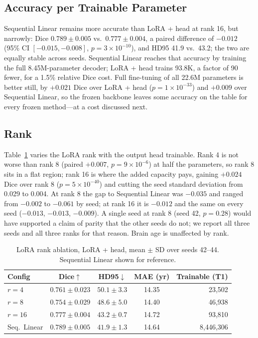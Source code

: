\documentclass[journal,twoside,web]{ieeecolor}
\begin{document}
\subsection{Accuracy per Trainable Parameter}
\label{sec:res_cost}

Sequential Linear remains more accurate than LoRA + head at rank 16, but narrowly: Dice $0.789\pm0.005$ vs.\ $0.777\pm0.004$, a paired difference of $-0.012$ (95\% CI $[-0.015, -0.008]$, $p = 3{\times}10^{-10}$), and HD95 41.9 vs.\ 43.2; the two are equally stable across seeds. Sequential Linear reaches that accuracy by training the full 8.45M-parameter decoder; LoRA + head trains 93.8K, a factor of 90 fewer, for a 1.5\% relative Dice cost. Full fine-tuning of all 22.6M parameters is better still, by $+0.021$ Dice over LoRA + head ($p = 1{\times}10^{-33}$) and $+0.009$ over Sequential Linear, so the frozen backbone leaves some accuracy on the table for every frozen method---at a cost discussed next.

\subsection{Rank}
\label{sec:res_rank}

Table~\ref{tab:rank} varies the LoRA rank with the output head trainable. Rank 4 is not worse than rank 8 (paired $+0.007$, $p = 9{\times}10^{-6}$) at half the parameters, so rank 8 sits in a flat region; rank 16 is where the added capacity pays, gaining $+0.024$ Dice over rank 8 ($p = 5{\times}10^{-40}$) and cutting the seed standard deviation from 0.029 to 0.004. At rank 8 the gap to Sequential Linear was $-0.035$ and ranged from $-0.002$ to $-0.061$ by seed; at rank 16 it is $-0.012$ and the same on every seed ($-0.013$, $-0.013$, $-0.009$). A single seed at rank 8 (seed 42, $p=0.28$) would have supported a claim of parity that the other seeds do not; we report all three seeds and all three ranks for that reason. Brain age is unaffected by rank.

\begin{table}[t]
\caption{LoRA rank ablation, LoRA + head, mean $\pm$ SD over seeds 42--44. Sequential Linear shown for reference.}
\label{tab:rank}
\centering
\footnotesize
\setlength{\tabcolsep}{4pt}
\begin{tabular}{lcccr}
\toprule
Config & Dice$\uparrow$ & HD95$\downarrow$ & MAE (yr) & Trainable (T1) \\
\midrule
$r=4$   & $0.761\pm0.023$ & $50.1\pm3.3$ & 14.35 & 23,502 \\
$r=8$   & $0.754\pm0.029$ & $48.6\pm5.0$ & 14.40 & 46,938 \\
$r=16$  & $\mathbf{0.777\pm0.004}$ & $\mathbf{43.2\pm0.7}$ & 14.72 & 93,810 \\
\midrule
Seq.\ Linear & $0.789\pm0.005$ & $41.9\pm1.3$ & 14.64 & 8,446,306 \\
\bottomrule
\end{tabular}
\end{table}
\end{document}
